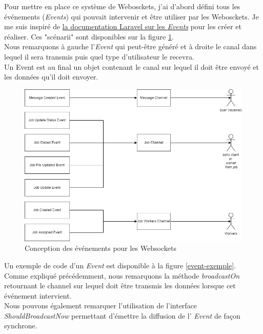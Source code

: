 \documentclass[
    iai, %
    il, %
]{heig-tb}
\begin{document}
Pour mettre en place ce système de Webosckets, j'ai d'abord défini tous les événements (\emph{Events}) qui pouvait intervenir et être utiliser par les Webosckets. Je me suis inspiré de \href{https://laravel.com/docs/9.x/events}{la documentation Laravel sur les \emph{Events}} pour les créer et réaliser.
Ces "scénarii" sont disponibles sur la figure \ref{ws-conception-notifications.drawio}. \\
Nous remarquons à gauche l'\emph{Event} qui peut-être généré et à droite le canal dans lequel il sera transmis puis quel type d'utilisateur le recevra. \\
Un Event est au final un objet contenant le canal sur lequel il doit être envoyé et les données qu'il doit envoyer.

\begin{center}
    \begin{figure}
        \includegraphics[width=\textwidth]{./assets/figures/ws-conception-notifications.drawio.png}
        \caption{Conception des événements pour les Websockets \label{ws-conception-notifications.drawio}}
    \end{figure}
\end{center}

Un exemple de code d'un \emph{Event} est disponible à la figure \ref{event-exemple}. \\
Comme expliqué précédemment, nous remarquons la méthode \emph{broadcastOn} retournant le channel sur lequel doit être transmis les données lorsque cet événement intervient. \\
Nous pouvons également remarquer l'utilisation de l'interface \emph{ShouldBroadcastNow} permettant d'émettre la diffusion de l' \emph{Event} de façon synchrone.
\end{document}
